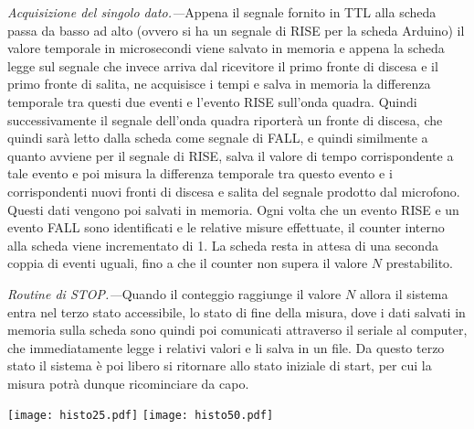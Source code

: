 \documentclass[
    prl,
    reprint, 
    superscriptaddress, 
    altaffilletter, 
    amsmath, 
    amssymb, 
    a4paper,
    varvw]{revtex4-2}
\begin{document}
\textit{Acquisizione del singolo dato.---}Appena il segnale fornito in TTL alla scheda passa da basso ad alto (ovvero si ha un segnale di RISE per la scheda Arduino) il valore temporale in microsecondi viene salvato in memoria e appena la scheda legge sul segnale che invece arriva dal ricevitore il primo fronte di discesa e il primo fronte di salita, ne acquisisce i tempi e salva in memoria la differenza temporale tra questi due eventi e l'evento RISE sull'onda quadra. Quindi successivamente il segnale dell'onda quadra riporterà un fronte di discesa, che quindi sarà letto dalla scheda come segnale di FALL, e quindi similmente a quanto avviene per il segnale di RISE, salva il valore di tempo corrispondente a tale evento e poi misura la differenza temporale tra questo evento e i corrispondenti nuovi fronti di discesa e salita del segnale prodotto dal microfono. Questi dati vengono poi salvati in memoria. Ogni volta che un evento RISE e un evento FALL sono identificati e le relative misure effettuate, il counter interno alla scheda viene incrementato di 1. La scheda resta in attesa di una seconda coppia di eventi uguali, fino a che il counter non supera il valore $N$ prestabilito. 

\textit{Routine di \emph{STOP}.---}Quando il conteggio raggiunge il valore $N$ allora il sistema entra nel terzo stato accessibile, lo stato di fine della misura, dove i dati salvati in memoria sulla scheda sono quindi poi comunicati attraverso il seriale al computer, che immediatamente legge i relativi valori e li salva in un file. Da questo terzo stato il sistema è poi libero si ritornare allo stato iniziale di start, per cui la misura potrà dunque ricominciare da capo. 

\begin{figure*}
    \texttt{[image: histo25.pdf]}
    \texttt{[image: histo50.pdf]}
    \caption{Istogrammi dei set di dati raccolti (sono riportati quelli per le misure a \SI{0.25}{\metre} e quelle per le misure a \SI{0.5}{\metre}). Per ogni distanza sono raccolti $N=50$ punti, sia per l'evento RISE che per l'evento FALL, in due istanti differenti, un per il primo fronte di variazione del segnale fornito dal microfono, uno per il secondo fronte. La media tra queste due misure permette di ottenere poi una misura più precisa dell'effettivo fronte d'onda che viene rilevato dal microfono. }\label{fig:hists_test}
\end{figure*}
\end{document}
